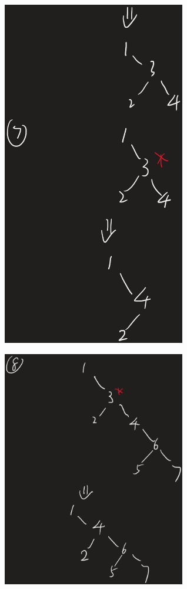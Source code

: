 \documentclass[UTF8]{ctexart}
\begin{document}
\includegraphics[width=0.6\textwidth]{3.png}

\includegraphics[width=0.6\textwidth]{4.png}
\end{document}
